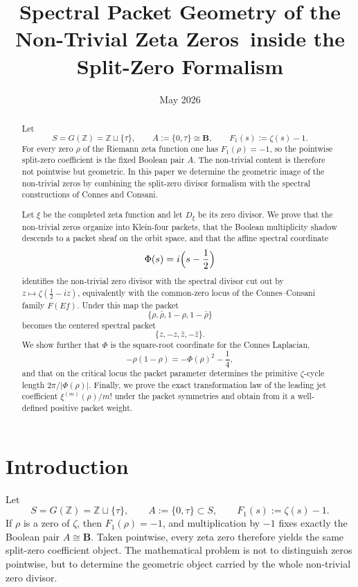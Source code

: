 \documentclass[11pt,a4paper]{article}
\title{Spectral Packet Geometry of the Non-Trivial Zeta Zeros\
inside the Split-Zero Formalism}
\author{}
\date{May 2026}
\theoremstyle{definition}
\theoremstyle{remark}
\newcommand{\ZZ}{\mathbb Z}
\newcommand{\BB}{\mathbf B}
\newcommand{\taup}{\tau}
\begin{document}
\maketitle

\begin{abstract}
Let
\[
S=G(\ZZ)=\ZZ\sqcup\{\taup\},\qquad A:=\{0,\taup\}\cong \BB,
\qquad F_1(s):=\zeta(s)-1.
\]
For every zero $\rho$ of the Riemann zeta function one has $F_1(\rho)=-1$, so the pointwise split-zero coefficient is the fixed Boolean pair $A$.  The non-trivial content is therefore not pointwise but geometric.  In this paper we determine the geometric image of the non-trivial zeros by combining the split-zero divisor formalism with the spectral constructions of Connes and Consani.

Let $\xi$ be the completed zeta function and let $D_\xi$ be its zero divisor.  We prove that the non-trivial zeros organize into Klein-four packets, that the Boolean multiplicity shadow descends to a packet sheaf on the orbit space, and that the affine spectral coordinate
\[
\Phi(s)=i\Bigl(s-\frac12\Bigr)
\]
identifies the non-trivial zero divisor with the spectral divisor cut out by $z\mapsto \zeta(\frac12-iz)$, equivalently with the common-zero locus of the Connes--Consani family $F(Ef)$.  Under this map the packet
\[
\{\rho,\bar\rho,1-\rho,1-\bar\rho\}
\]
becomes the centered spectral packet
\[
\{z,-z,\bar z,-\bar z\}.
\]
We show further that $\Phi$ is the square-root coordinate for the Connes Laplacian,
\[
-\rho(1-\rho)=-\Phi(\rho)^2-\frac14,
\]
and that on the critical locus the packet parameter determines the primitive $\zeta$-cycle length $2\pi/|\Phi(\rho)|$.  Finally, we prove the exact transformation law of the leading jet coefficient $\xi^{(m)}(\rho)/m!$ under the packet symmetries and obtain from it a well-defined positive packet weight.
\end{abstract}

\tableofcontents

\section{Introduction}

Let
\[
S=G(\ZZ)=\ZZ\sqcup\{\taup\},
\qquad
A:=\{0,\taup\}\subset S,
\qquad
F_1(s):=\zeta(s)-1.
\]
If $\rho$ is a zero of $\zeta$, then $F_1(\rho)=-1$, and multiplication by $-1$ fixes exactly the Boolean pair $A\cong\BB$.  Taken pointwise, every zeta zero therefore yields the same split-zero coefficient object.  The mathematical problem is not to distinguish zeros pointwise, but to determine the geometric object carried by the whole non-trivial zero divisor.
\end{document}
